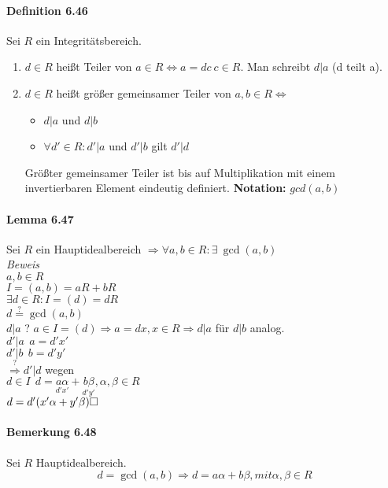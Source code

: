 \documentclass{scrartcl}
\begin{document}
\paragraph{Definition 6.46}
Sei $R$ ein Integritätsbereich.
\begin{enumerate}
\item $d \in R$ heißt Teiler von $a \in R \Leftrightarrow a = dc ~ c \in R$.
  Man schreibt $d|a$ (d teilt a).
\item $d \in R$ heißt größer gemeinsamer Teiler von $a,b \in R \Leftrightarrow$
  \begin{itemize}
  \item $d|a$ und $d|b$
  \item $\forall d' \in R: d'|a$ und $d'|b$ gilt $d'|d$
  \end{itemize}
  Größter gemeinsamer Teiler ist bis auf Multiplikation mit einem invertierbaren
  Element eindeutig definiert.
  \textbf{Notation:} $gcd(a,b)$
\end{enumerate}

\paragraph{Lemma 6.47}
Sei $R$ ein Hauptidealbereich $\Rightarrow \forall a,b \in R: \exists ~ \gcd(a,b)$
\\
\textit{Beweis} \\
$a,b \in R$ \\
$ I = (a,b) = aR + bR$ \\
$\exists d \in R: I = (d) = dR$ \\
$d \overset{?}{=} \gcd(a,b)$ \\
$d|a$ ? $a \in I = (d) \Rightarrow a = dx, x \in R \Rightarrow d|a$ für $d|b$ analog.
\\
$d'|a ~~ a = d'x'$ \\
$d'|b ~~ b = d'y'$ \\
$\overset{?}{\Rightarrow} d'|d$ wegen \\
$d \in I ~~ d = \underset{d'x'}{a \alpha}
+ \underset{d'y'}{b \beta} , \alpha, \beta \in R$ \\
$d = d'(x' \alpha + y' \beta) \hfill \square$

\paragraph{Bemerkung 6.48}
Sei $R$ Hauptidealbereich.
\[
  d = \gcd(a,b) \Rightarrow d = a\alpha + b\beta, mit \alpha,\beta \in R
\]
\end{document}

